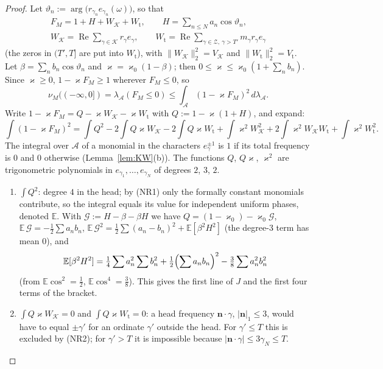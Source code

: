 \documentclass[11pt]{amsart}
\theoremstyle{definition}
\numberwithin{equation}{section}
\newcommand{\EE}{\mathbb E}
\newcommand{\re}{\operatorname{Re}}
\newcommand{\cA}{\mathcal A}          %
\newcommand{\cZ}{\mathcal Z}          %
\newcommand{\cK}{\mathcal K}          %
\newcommand{\hA}{\lambda_{\cA}}       %
\begin{document}
\begin{proof}
Let $\vartheta_n:=\arg\bigl(r_{\gamma_n}e_{\gamma_n}(\omega)\bigr)$,
so that
\begin{gather*}
F_M=1+H+W_{\cK}+W_{\mathrm t},\qquad
H=\sum_{n\le N}a_n\cos\vartheta_n,\\
W_{\cK}=\re\sum_{\gamma\in\cK}r_\gamma e_\gamma,\qquad
W_{\mathrm t}=\re\sum_{\gamma\in\cZ,\ \gamma>T'}m_\gamma r_\gamma e_\gamma
\end{gather*}
(the zeros in $(T',T]$ are put into $W_{\mathrm t}$), with
$\|W_{\cK}\|_2^2=V_{\cK}$ and $\|W_{\mathrm t}\|_2^2=V_{\mathrm t}$.
Let $\beta=\sum_nb_n\cos\vartheta_n$ and
$\varkappa=\varkappa_0(1-\beta)$; then
$0\le\varkappa\le\varkappa_0(1+\sum_nb_n)$. Since $\varkappa\ge0$,
$1-\varkappa F_M\ge1$ wherever $F_M\le0$, so
\[
\nu_M((-\infty,0])=\hA(F_M\le0)\le\int_{\cA}(1-\varkappa F_M)^2\,d\hA .
\]
Write $1-\varkappa F_M=Q-\varkappa W_{\cK}-\varkappa W_{\mathrm t}$
with $Q:=1-\varkappa(1+H)$, and expand:
\[
\int(1-\varkappa F_M)^2=\int Q^2-2\int Q\varkappa W_{\cK}
-2\int Q\varkappa W_{\mathrm t}+\int\varkappa^2W_{\cK}^2
+2\int\varkappa^2W_{\cK}W_{\mathrm t}+\int\varkappa^2W_{\mathrm t}^2 .
\]
The integral over $\cA$ of a monomial in the characters
$e_\gamma^{\pm1}$ is $1$ if its total frequency is $0$ and $0$
otherwise (Lemma~\ref{lem:KW}(b)). The functions $Q$, $Q\varkappa$,
$\varkappa^2$ are trigonometric polynomials in
$e_{\gamma_1},\dots,e_{\gamma_N}$ of degrees $2$, $3$, $2$.
\begin{enumerate}
\item[1.] $\int Q^2$: degree $4$ in the head; by (NR1) only the
formally constant monomials contribute, so the integral equals its
value for independent uniform phases, denoted $\EE$. With
$\mathcal G:=H-\beta-\beta H$ we have
$Q=(1-\varkappa_0)-\varkappa_0\mathcal G$,
$\EE\,\mathcal G=-\tfrac12\sum a_nb_n$,
$\EE\,\mathcal G^2=\tfrac12\sum(a_n-b_n)^2+\EE[\beta^2H^2]$ (the
degree-$3$ term has mean $0$), and
\[
\EE[\beta^2H^2]=\tfrac14\sum a_n^2\sum b_n^2
+\tfrac12\Bigl(\sum a_nb_n\Bigr)^2-\tfrac38\sum a_n^2b_n^2
\]
(from $\EE\cos^2=\tfrac12$, $\EE\cos^4=\tfrac38$). This gives the
first line of $J$ and the first four terms of the bracket.
\item[2.] $\int Q\varkappa W_{\cK}=0$ and
$\int Q\varkappa W_{\mathrm t}=0$: a head frequency
$\mathbf n\cdot\gamma$, $|\mathbf n|_1\le3$, would have to equal
$\pm\gamma'$ for an ordinate $\gamma'$ outside the head. For
$\gamma'\le T$ this is excluded by (NR2); for $\gamma'>T$ it is
impossible because $|\mathbf n\cdot\gamma|\le3\gamma_N\le T$.

\end{enumerate}
\end{proof}
\end{document}
